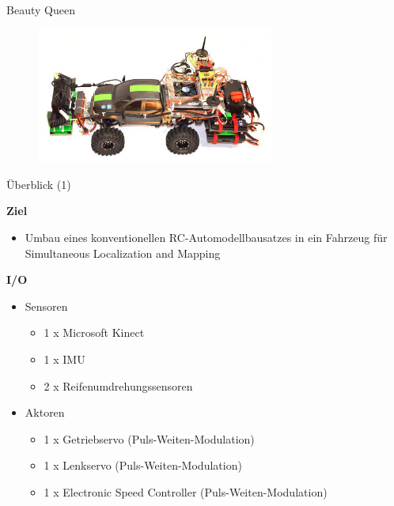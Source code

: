 \documentclass{beamer}
\begin{document}
\begin{frame}{Beauty Queen}
 \begin{figure}[H]
  \centering
  \includegraphics[width=0.7\textwidth]{./images/robot-beauty-queen.jpg}
 \end{figure}
\end{frame}
\begin{frame}{\"Uberblick (1)}
\begin{large}\textbf{Ziel}\end{large}
\begin{itemize}
	\item Umbau eines konventionellen RC-Automodellbausatzes in ein Fahrzeug f\"ur Simultaneous Localization and Mapping
\end{itemize}
\vspace{20px}
\begin{large}\textbf{I/O}\end{large}
\begin{itemize}
	\item Sensoren
	\begin{itemize}
		\item 1 x Microsoft Kinect
		\item 1 x IMU
		\item 2 x Reifenumdrehungssensoren
	\end{itemize}
	\item Aktoren
	\begin{itemize}
		\item 1 x Getriebservo (Puls-Weiten-Modulation)
		\item 1 x Lenkservo (Puls-Weiten-Modulation)
		\item 1 x Electronic Speed Controller (Puls-Weiten-Modulation)
	\end{itemize}
\end{itemize}	
\end{frame}
\end{document}

